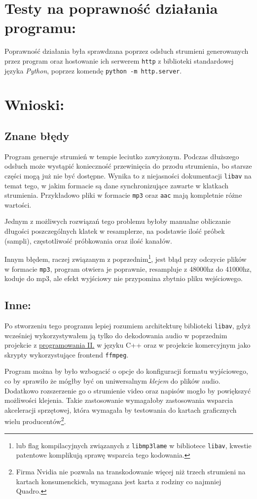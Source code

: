 \documentclass[a4paper,12pt]{article}
\begin{document}
\section{Testy na poprawność działania programu:}

Poprawność działania była sprawdzana poprzez odsłuch strumieni generowanych
przez program oraz hostowanie ich serwerem \texttt{http} z biblioteki
standardowej języka \emph{Python}, poprzez komendę \texttt{python -m
http.server}.

\section{Wnioski:}

\subsection*{Znane błędy}

Program generuje strumień w tempie leciutko zawyżonym. Podczas dłuższego odsłuch
może wystąpić konieczność przewinięcia do przodu strumienia, bo starsze części
mogą już nie być dostępne. Wynika to z niejasności dokumentacji \texttt{libav}
na temat tego, w jakim formacie są dane synchronizujące zawarte w klatkach
strumienia. Przykładowo pliki w formacie \texttt{mp3} oraz \texttt{aac}
mają kompletnie różne wartości. 

Jednym z możliwych rozwiązań tego problemu byłoby manualne obliczanie długości
poszczególnych klatek w resamplerze, na podstawie ilość próbek (sampli),
częstotliwość próbkowania oraz ilość kanałów.

Innym błędem, raczej związanym z poprzednim\footnote{lub flag kompilacyjnych
związanych z \texttt{libmp3lame} w bibliotece \texttt{libav}, kwestie patentowe
komplikują sprawę wsparcia tego kodowania.}, jest błąd przy odczycie plików w
formacie \texttt{mp3}, program otwiera je poprawnie, resampluje z 48000hz do
41000hz, koduje do mp3, ale efekt wyjściowy nie przypomina zbytnio pliku
wejściowego.

\subsection*{Inne:}

Po stworzeniu tego programu lepiej rozumiem architekturę biblioteki
\texttt{libav}, gdyż wcześniej wykorzystywałem ją tylko do dekodowania audio w
poprzednim projekcie z
\href{https://github.com/HakierGrzonzo/GrzesSFMLlib}{programowania II.} w języku
C++ oraz w projekcie komercyjnym jako skrypty wykorzystujące frontend
\texttt{ffmpeg}. 

Program można by było wzbogacić o opcje do konfiguracji formatu wyjściowego, co
by sprawiło że mógłby być on uniwersalnym \emph{klejem} do plików audio.
Dodatkowo rozszerzenie go o strumienie video oraz napisów mogło by powiększyć
możliwości klejenia. Takie zastosowanie wymagałoby zastosowania wsparcia
akceleracji sprzętowej, która wymagała by testowania do kartach graficznych
wielu producentów\footnote{Firma Nvidia nie pozwala na transkodowanie więcej niż
trzech strumieni na kartach konsumenckich, wymagana jest karta z rodziny
co najmniej Quadro.}. 
\end{document}
